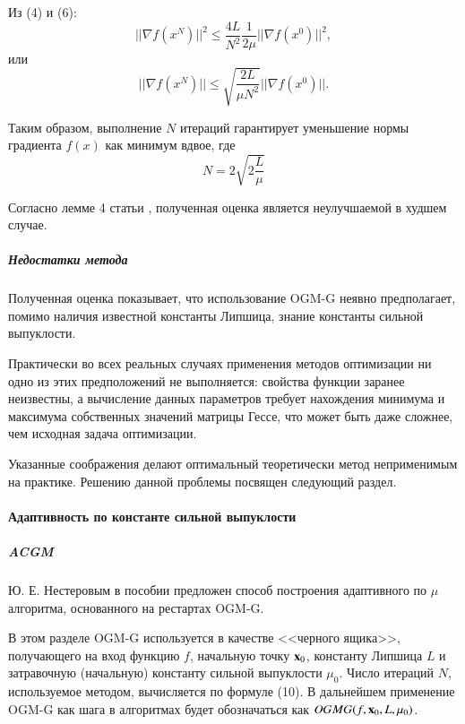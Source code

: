 \documentclass{crm-article}
\begin{document}
Из (4) и (6):
\begin{equation}
||\nabla f(x^N)||^2\leq \frac{4L}{N^2}\frac{1}{2\mu}||\nabla f(x^0)||^2,
\end{equation}
или
\begin{equation}
||\nabla f(x^N)||\leq \sqrt{\frac{2L}{\mu N^2}}||\nabla f(x^0)||.
\end{equation}

Таким образом, выполнение $N$ итераций гарантирует уменьшение нормы градиента $f(x)$ как минимум вдвое, где
\begin{equation}
    N=2\sqrt{2\frac{L}{\mu}}
\end{equation}

Согласно лемме 4 статьи \cite{kim2018fessler}, полученная оценка является неулучшаемой в худшем случае.

\subparagraph{Недостатки метода}

Полученная оценка показывает, что использование OGM-G неявно предполагает, помимо наличия известной константы Липшица, знание константы сильной выпуклости.

Практически во всех реальных случаях применения методов оптимизации ни одно из этих предположений не выполняется: свойства функции заранее неизвестны, а вычисление данных параметров требует нахождения минимума и максимума собственных значений матрицы Гессе, что может быть даже сложнее, чем исходная задача оптимизации.

Указанные соображения делают оптимальный теоретически метод неприменимым на практике. Решению данной проблемы посвящен следующий раздел.

\paragraph{Адаптивность по константе сильной выпуклости}

\subparagraph{ACGM}

Ю. Е. Нестеровым в пособии \cite{gasnikov2017universal} предложен способ построения адаптивного по $\mu$ алгоритма, основанного на рестартах OGM-G.

В этом разделе OGM-G используется в качестве <<черного ящика>>, получающего на вход функцию $f$, начальную точку ${\bf x}_0$, константу Липшица $L$ и затравочную (начальную) константу сильной выпуклости $\mu_0$. Число итераций $N$, используемое методом, вычисляется по формуле (10). В дальнейшем применение OGM-G как шага в алгоритмах будет обозначаться как $OGMG(f, {\bf x}_0, L, \mu_0)$.
\end{document}
